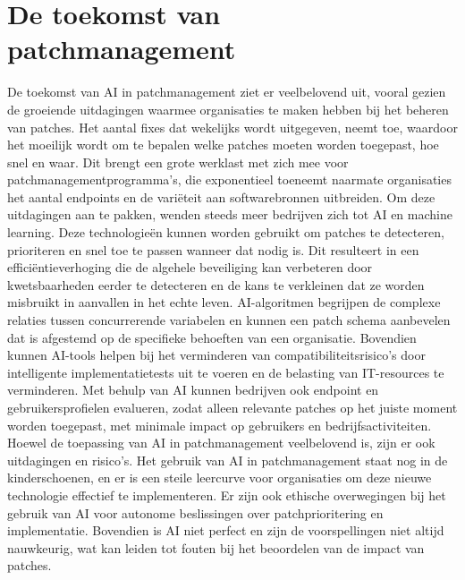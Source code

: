 \section{De toekomst van patchmanagement}
De toekomst van AI in patchmanagement ziet er veelbelovend uit, vooral gezien de groeiende uitdagingen waarmee organisaties te maken hebben bij het beheren van patches. Het aantal fixes dat wekelijks wordt uitgegeven, neemt toe, waardoor het moeilijk wordt om te bepalen welke patches moeten worden toegepast, hoe snel en waar. Dit brengt een grote werklast met zich mee voor patchmanagementprogramma's, die exponentieel toeneemt naarmate organisaties het aantal endpoints en de variëteit aan softwarebronnen uitbreiden.
Om deze uitdagingen aan te pakken, wenden steeds meer bedrijven zich tot AI en machine learning. Deze technologieën kunnen worden gebruikt om patches te detecteren, prioriteren en snel toe te passen wanneer dat nodig is. Dit resulteert in een efficiëntieverhoging die de algehele beveiliging kan verbeteren door kwetsbaarheden eerder te detecteren en de kans te verkleinen dat ze worden misbruikt in aanvallen in het echte leven.
AI-algoritmen begrijpen de complexe relaties tussen concurrerende variabelen en kunnen een patch schema aanbevelen dat is afgestemd op de specifieke behoeften van een organisatie. Bovendien kunnen AI-tools helpen bij het verminderen van compatibiliteitsrisico's door intelligente implementatietests uit te voeren en de belasting van IT-resources te verminderen. Met behulp van AI kunnen bedrijven ook endpoint en gebruikersprofielen evalueren, zodat alleen relevante patches op het juiste moment worden toegepast, met minimale impact op gebruikers en bedrijfsactiviteiten.
Hoewel de toepassing van AI in patchmanagement veelbelovend is, zijn er ook uitdagingen en risico's. Het gebruik van AI in patchmanagement staat nog in de kinderschoenen, en er is een steile leercurve voor organisaties om deze nieuwe technologie effectief te implementeren. Er zijn ook ethische overwegingen bij het gebruik van AI voor autonome beslissingen over patchprioritering en implementatie. Bovendien is AI niet perfect en zijn de voorspellingen niet altijd nauwkeurig, wat kan leiden tot fouten bij het beoordelen van de impact van patches. \autocite{OFlaherty2023}

